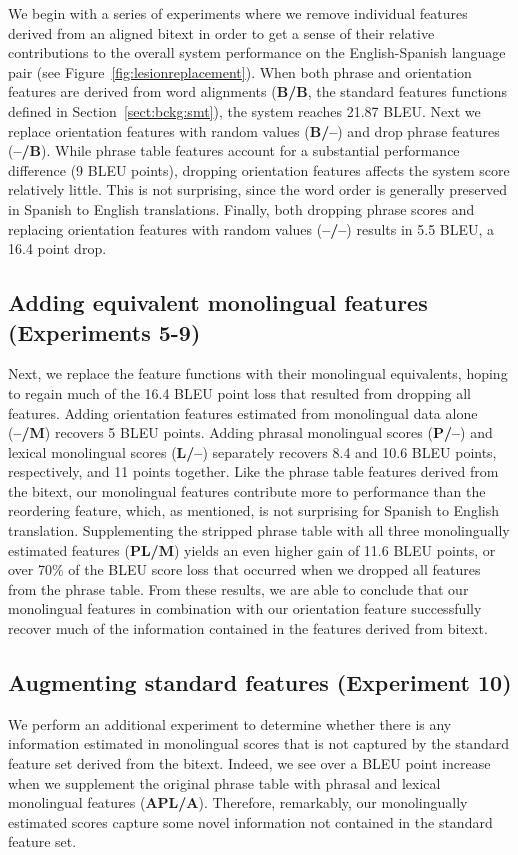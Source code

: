 \documentclass[11pt]{article}
\newcommand{\secref}[1]{Section~\ref{#1}}
\newcommand{\figref}[1]{Figure~\ref{#1}}
\begin{document}
We begin with a series of experiments where we remove individual features derived from an aligned bitext in order to get a sense of their relative contributions to the overall system performance on the English-Spanish language pair (see \figref{fig:lesionreplacement}). When both phrase and orientation features are derived from word alignments ({\bf B/B}, the standard features functions defined in \secref{sect:bckg:smt}), the system reaches 21.87 BLEU.  Next we replace orientation features with random values ({\bf B/--}) and drop phrase features ({\bf --/B}).  While phrase table features account for a substantial performance difference (9 BLEU points), dropping orientation features affects the system score relatively little.  This is not surprising, since the word order is generally preserved in Spanish to English translations.  Finally, both dropping phrase scores and replacing orientation features with random values ({\bf --/--}) results in 5.5 BLEU, a 16.4 point drop.

\subsection{Adding equivalent monolingual features (Experiments 5-9)} \label{sect:exp:replacement}

Next, we replace the feature functions with their monolingual equivalents, hoping to regain much of the 16.4 BLEU point loss that resulted from dropping all features.  Adding orientation features estimated from monolingual data alone ({\bf --/M})  recovers 5 BLEU points. Adding phrasal monolingual scores ({\bf P/--}) and lexical monolingual scores ({\bf L/--}) separately recovers 8.4 and 10.6 BLEU points, respectively, and 11 points together. Like the phrase table features derived from the bitext, our monolingual features contribute more to performance than the reordering feature, which, as mentioned, is not surprising for Spanish to English translation. Supplementing the stripped phrase table with all three monolingually estimated features ({\bf PL/M}) yields an even higher gain of 11.6 BLEU points, or over 70\% of the BLEU score loss that occurred when we dropped all features from the phrase table. From these results, we are able to conclude that our monolingual features in combination with our orientation feature successfully recover much of the information contained in the features derived from bitext. 

\subsection{Augmenting standard features (Experiment 10)}
We perform an additional experiment to determine whether there is any information estimated in monolingual scores that is not captured by the standard feature set derived from the bitext. Indeed, we see over a BLEU point increase when we supplement the original phrase table with phrasal and lexical monolingual features ({\bf APL/A}). Therefore, remarkably, our monolingually estimated scores capture some novel information not contained in the standard feature set.
\end{document}
